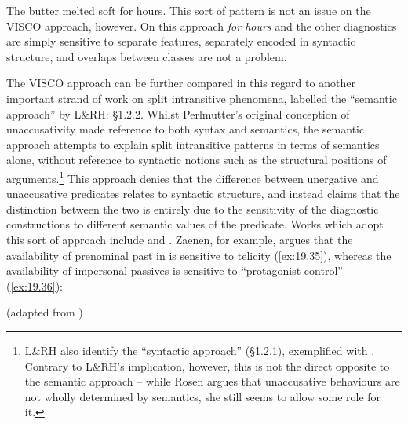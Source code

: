 \documentclass[output=paper]{langsci/langscibook}
\begin{document}
\ea The butter melted soft for hours.
\z
This sort of pattern is not an issue on the VISCO approach, however. On this
approach \emph{for hours} and the other diagnostics are simply sensitive to
separate features, separately encoded in syntactic structure, and overlaps
between classes are not a problem.

The VISCO approach can be further compared in this regard to another important
strand of work on split intransitive phenomena, labelled the
\enquote{semantic approach} by L\&RH: §1.2.2. Whilst Perlmutter’s original
conception of unaccusativity made reference to both syntax and semantics, the
semantic approach attempts to explain split intransitive patterns in terms of
semantics alone, without reference to syntactic notions such as the structural
positions of arguments.\footnote{L\&RH also identify the \enquote{syntactic
approach} (§1.2.1), exemplified with \citet{Rosen1984}. Contrary to L\&RH’s
implication, however, this is not the direct opposite to the semantic approach
– while Rosen argues that unaccusative behaviours are not wholly determined by
semantics, she still seems to allow some role for it.}  This approach denies
that the difference between unergative and unaccusative predicates relates to
syntactic structure, and instead claims that the distinction between the two is
entirely due to the sensitivity of the diagnostic constructions to different
semantic values of the predicate. Works which adopt this sort of approach
include \citet{Valin1990} and \citet{Zaenen1993}. Zaenen, for example,
argues that the availability of prenominal past  in
 is sensitive to telicity (\ref{ex:19.35}), whereas the availability
of impersonal passives is sensitive to \enquote{protagonist control}
(\ref{ex:19.36}):

\ea\label{ex:19.35}  (adapted from \citealt[140]{Zaenen1993})
    \z
\z
\end{document}
